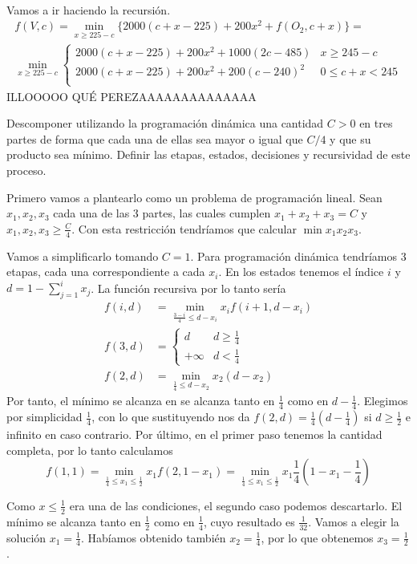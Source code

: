 \documentclass[twoside]{article}
\begin{document}
\begin{ejercicio}{5}
\begin{solucion}
\begin{align*}
\end{align*}
Vamos a ir haciendo la recursión.
\begin{gather*}
f(V,c)=\min_{x\geq 225-c}\{2000(c+x-225)+200x^2+f(O_2,c+x)\}=\\
\min_{x\geq 225-c}\begin{cases}
2000(c+x-225)+200x^2+1000(2c-485) &x\geq 245-c\\
2000(c+x-225)+200x^2+200(c-240)^2 &0\leq c+x< 245\\
\end{cases}
\end{gather*}
ILLOOOOO QUÉ PEREZAAAAAAAAAAAAAA
\end{solucion}
\end{ejercicio}

\newpage 
\begin{ejercicio}{6}\label{6}
Descomponer utilizando la programación dinámica una cantidad $C > 0$ en tres partes de forma
que cada una de ellas sea mayor o igual que $C/4$ y que su producto sea mínimo. Definir las etapas,
estados, decisiones y recursividad de este proceso.
\end{ejercicio}
\begin{solucion}
Primero vamos a plantearlo como un problema de programación lineal. Sean $x_1,x_2,x_3$ cada una de las 3 partes, las cuales cumplen $x_1+x_2+x_3=C$ y $x_1,x_2,x_3\geq\frac{C}{4}$. Con esta restricción tendríamos que calcular $\min x_1x_2x_3$. 

Vamos a simplificarlo tomando $C=1$. Para programación dinámica tendríamos 3 etapas, cada una correspondiente a cada $x_i$. En los estados tenemos el índice $i$ y $d=1-\sum_{j=1}^ix_j$. La función recursiva por lo tanto sería
\begin{align*}
f(i,d)&=\min_{\frac{3-i}{4}\leq d-x_i} x_if(i+1,d-x_i) \\
f(3,d)&=\begin{cases}
d & d\geq\frac{1}{4}\\
+\infty & d<\frac{1}{4}
\end{cases}\\
f(2,d)&=\min_{\frac{1}{4}\leq d-x_2} x_2(d-x_2) 
\end{align*}
Por tanto, el mínimo se alcanza en  se alcanza tanto en $\frac{1}{4}$ como en $d-\frac{1}{4}$. Elegimos por simplicidad $\frac{1}{4}$, con lo que sustituyendo nos da $f(2,d)=\frac{1}{4}(d-\frac{1}{4})$ si $d\geq\frac{1}{2}$ e infinito en caso contrario. Por último, en el primer paso tenemos la cantidad completa, por lo tanto calculamos
$$f(1,1)=\min_{\frac{1}{4}\leq x_1\leq\frac{1}{2}}x_1f(2,1-x_1)=\min_{\frac{1}{4}\leq x_1\leq\frac{1}{2}} x_1\frac{1}{4}(1-x_1-\frac{1}{4})$$

Como $x\leq\frac{1}{2}$ era una de las condiciones, el segundo caso podemos descartarlo. El mínimo se alcanza tanto en $\frac{1}{2}$ como en $\frac{1}{4}$, cuyo resultado es $\frac{1}{32}$. Vamos a elegir la solución $x_1=\frac{1}{4}$. Habíamos obtenido también $x_2=\frac{1}{4}$, por lo que obtenemos $x_3=\frac{1}{2}$.
\end{solucion}
\end{document}
